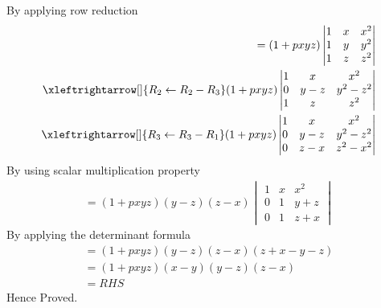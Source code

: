 By applying row reduction
\begin{align}
=(1+pxyz)\begin{vmatrix}
1&x&x^2\\1&y&y^2\\1&z&z^2
\end{vmatrix}\\
 \xleftrightarrow[]{R_2 \leftarrow R_2-R_3}
(1+pxyz)\begin{vmatrix}
1&x&x^2\\0&y-z&y^2-z^2\\1&z&z^2
\end{vmatrix}\\
 \xleftrightarrow[]{R_3 \leftarrow R_3-R_1}
(1+pxyz)\begin{vmatrix}
1&x&x^2\\0&y-z&y^2-z^2\\0&z-x&z^2-x^2
\end{vmatrix}
\end{align}
By using scalar multiplication property
\begin{align}
=(1+pxyz)(y-z)(z-x)\begin{vmatrix}
1&x&x^2\\0&1&y+z\\0&1&z+x
\end{vmatrix}
\end{align}
By applying the determinant formula
\begin{align}
=(1+pxyz)(y-z)(z-x)(z+x-y-z)\\
=(1+pxyz)(x-y)(y-z)(z-x)\\
= RHS
\end{align}
Hence Proved.
